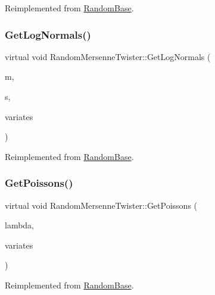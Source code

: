 Reimplemented from \hyperlink{classRandomBase_a8428b19f897b202363c12df1471a8d52}{Random\+Base}.

\hypertarget{classRandomMersenneTwister_a138aef807030513957f98abe6235e791}{}\label{classRandomMersenneTwister_a138aef807030513957f98abe6235e791} 
\subsubsection{\texorpdfstring{Get\+Log\+Normals()}{GetLogNormals()}}
{\footnotesize\ttfamily virtual void Random\+Mersenne\+Twister\+::\+Get\+Log\+Normals (\begin{DoxyParamCaption}\item[{double}]{m,  }\item[{double}]{s,  }\item[{\hyperlink{classMJArray}{M\+J\+Array} \&}]{variates }\end{DoxyParamCaption})\hspace{0.3cm}{\ttfamily [virtual]}}



Reimplemented from \hyperlink{classRandomBase_a734f1712b1179fb31380e04da4a27f20}{Random\+Base}.

\hypertarget{classRandomMersenneTwister_a7b53f211616ce5764705b192fbc0a009}{}\label{classRandomMersenneTwister_a7b53f211616ce5764705b192fbc0a009} 
\subsubsection{\texorpdfstring{Get\+Poissons()}{GetPoissons()}}
{\footnotesize\ttfamily virtual void Random\+Mersenne\+Twister\+::\+Get\+Poissons (\begin{DoxyParamCaption}\item[{double}]{lambda,  }\item[{\hyperlink{classMJArray}{M\+J\+Array} \&}]{variates }\end{DoxyParamCaption})\hspace{0.3cm}{\ttfamily [virtual]}}



Reimplemented from \hyperlink{classRandomBase_aa2e79f1f4c55c36df9c701d29e9b08a5}{Random\+Base}.

